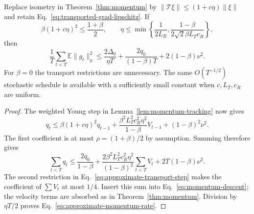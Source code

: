 \begin{corollary}
\label{cor:approximate-momentum}
Replace isometry in Theorem~\ref{thm:momentum} by
$\|\mathcal T\xi\|\leq(1+c\eta)\|\xi\|$ and retain
Eq.~\eqref{eq:transported-grad-lipschitz}. If
\begin{equation}
 \beta(1+c\eta)^2\leq\frac{1+\beta}{2},\qquad
 \eta\leq\min\left\{\frac1{2L_R},
 \frac{1-\beta}{2\sqrt2\beta L_Tc_R}\right\},
 \label{eq:approximate-transport-step}
\end{equation}
then
\begin{equation}
 \frac1T\sum_{t<T}\mathbb E\|g_t\|_g^2
 \leq\frac{2\Delta_0}{\eta T}
 +\frac{2q_0}{(1-\beta)T}+2(1-\beta)\nu^2.
 \label{eq:approximate-momentum-rate}
\end{equation}
For $\beta=0$ the transport restrictions are unnecessary. The same
$O(T^{-1/2})$ stochastic schedule is available with a sufficiently small
constant when $c,L_T,c_R$ are uniform.
\end{corollary}
\begin{proof}
The weighted Young step in Lemma~\ref{lem:momentum-tracking} now gives
\begin{equation}
 q_t\leq\beta(1+c\eta)^2q_{t-1}
 +\frac{\beta^2L_T^2c_R^2\eta^2}{1-\beta}V_{t-1}
 +(1-\beta)^2\nu^2.
\end{equation}
The first coefficient is at most $\rho=(1+\beta)/2$ by assumption.
Summing therefore gives
\begin{equation}
 \sum_{t<T}q_t\leq\frac{2q_0}{1-\beta}
 +\frac{2\beta^2L_T^2c_R^2\eta^2}{(1-\beta)^2}\sum_{t<T}V_t
 +2T(1-\beta)\nu^2.
\end{equation}
The second restriction in Eq.~\eqref{eq:approximate-transport-step}
makes the coefficient of $\sum V_t$ at most $1/4$.
Insert this sum into Eq.~\eqref{eq:momentum-descent}; the velocity terms
are absorbed as in Theorem~\ref{thm:momentum}. Division by $\eta T/2$
proves Eq.~\eqref{eq:approximate-momentum-rate}.
\end{proof}

